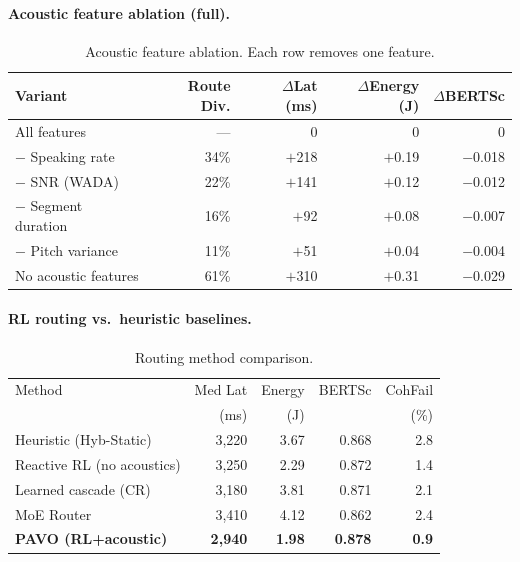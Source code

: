 \documentclass{article}
\begin{document}
\paragraph{Acoustic feature ablation (full).}

\begin{table}[H]
\centering
\caption{Acoustic feature ablation. Each row removes one feature.}
\label{tab:ablation_acoustic}
\small
\begin{tabular}{lrrrr}
\toprule
Variant & Route Div. & $\Delta$Lat (ms) & $\Delta$Energy (J) & $\Delta$BERTSc \\
\midrule
All features     & --- & 0 & 0 & 0 \\
$-$ Speaking rate       & 34\% & $+$218 & $+$0.19 & $-$0.018 \\
$-$ SNR (WADA)          & 22\% & $+$141 & $+$0.12 & $-$0.012 \\
$-$ Segment duration    & 16\% & $+$92  & $+$0.08 & $-$0.007 \\
$-$ Pitch variance      & 11\% & $+$51  & $+$0.04 & $-$0.004 \\
No acoustic features    & 61\% & $+$310 & $+$0.31 & $-$0.029 \\
\bottomrule
\end{tabular}
\end{table}

\paragraph{RL routing vs.\ heuristic baselines.}

\begin{table}[H]
\centering
\caption{Routing method comparison.}
\label{tab:ablation_routing}
\small
\begin{tabular}{lrrrr}
\toprule
Method & Med Lat & Energy & BERTSc & CohFail \\
 & (ms) & (J) & & (\%) \\
\midrule
Heuristic (Hyb-Static)    & 3{,}220 & 3.67 & 0.868 & 2.8 \\
Reactive RL (no acoustics) & 3{,}250 & 2.29 & 0.872 & 1.4 \\
Learned cascade (CR)      & 3{,}180 & 3.81 & 0.871 & 2.1 \\
MoE Router                & 3{,}410 & 4.12 & 0.862 & 2.4 \\
\textbf{PAVO (RL+acoustic)} & \textbf{2{,}940} & \textbf{1.98} & \textbf{0.878} & \textbf{0.9} \\
\bottomrule
\end{tabular}
\end{table}
\end{document}
